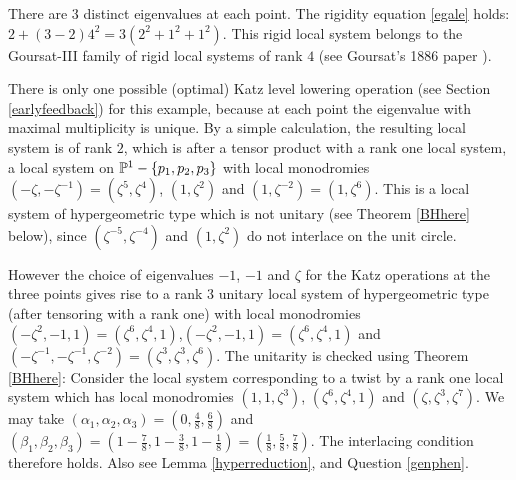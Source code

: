 There are 3 distinct eigenvalues at each point. The rigidity equation \eqref{egale} holds: $2 +(3-2)4^2= 3(2^2+1^2+1^2)$. This rigid local system belongs to the Goursat-III family of rigid local systems of rank $4$  (see Goursat's 1886 paper \cites{EGoursat}).

There is only one possible (optimal) Katz level lowering operation (see Section \ref{earlyfeedback}) for this example, because  at each point the eigenvalue with maximal multiplicity is unique. By a simple calculation, the resulting local system is of rank $2$, which is after a tensor product with a rank one local system, a local system on $\Bbb{P}^1-\{p_1,p_2,p_3\}$ with local monodromies $(-\zeta,-\zeta^{-1})=(\zeta^5,\zeta^4)$, $(1,\zeta^2)$ and $(1,\zeta^{-2})=(1,\zeta^6)$. This is a local system of hypergeometric type which is not unitary (see Theorem \ref{BHhere} below), since $(\zeta^{-5},\zeta^{-4})$ and
$(1,\zeta^2)$ do not interlace on the unit circle.

However  the choice of eigenvalues $-1$, $-1$ and $\zeta$ for the Katz operations at the three points gives rise to a rank $3$ unitary local system of hypergeometric type (after tensoring with a rank one)  with local monodromies $(-\zeta^{2},-1,1)=(\zeta^6,\zeta^4,1)$,$(-\zeta^{2},-1,1)=(\zeta^6,\zeta^4,1)$ and $(-\zeta^{-1},-\zeta^{-1},\zeta^{-2})=(\zeta^3,\zeta^3,\zeta^6)$. The unitarity is checked using Theorem \ref{BHhere}: Consider the local system corresponding to a twist by a rank one local system which has local monodromies $(1,1,\zeta^3)$, $(\zeta^6,\zeta^4,1)$ and $(\zeta,\zeta^3,\zeta^7)$. We may take $(\alpha_1,\alpha_2,\alpha_3)=(0,\frac{4}{8},\frac{6}{8})$ and $(\beta_1,\beta_2,\beta_3)=(1-\frac{7}{8},1-\frac{3}{8},1-\frac{1}{8})=(\frac{1}{8},\frac{5}{8},\frac{7}{8})$. The interlacing condition
therefore holds.  Also see Lemma \ref{hyperreduction}, and Question \ref{genphen}.
\iffalse
